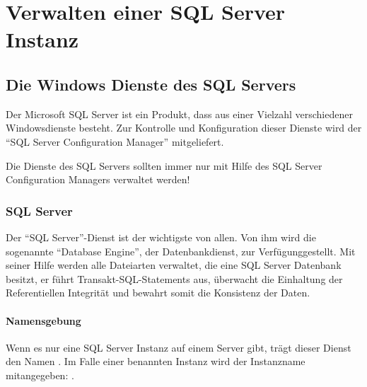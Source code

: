   \chapter{Verwalten einer SQL Server Instanz}
  \chaptertoc{}
  \cleardoubleevenpage

    \section{Die Windows Dienste des SQL Servers}
      Der Microsoft SQL Server ist ein Produkt, dass aus einer Vielzahl
      verschiedener Windowsdienste besteht. Zur Kontrolle und Konfiguration dieser
      Dienste wird der \enquote{SQL Server Configuration Manager} mitgeliefert.
      \begin{merke}
        Die Dienste des SQL Servers sollten immer nur mit Hilfe des SQL Server
        Configuration Managers verwaltet werden!
      \end{merke}
      \subsection{SQL Server}
        Der \enquote{SQL Server}-Dienst ist der wichtigste von allen. Von ihm
        wird die sogenannte \enquote{Database Engine}, der
        Datenbankdienst, zur Verfügunggestellt. Mit seiner Hilfe werden alle
        Dateiarten verwaltet, die eine SQL Server Datenbank besitzt, er führt
        Transakt-SQL-Statements aus, überwacht die Einhaltung der Referentiellen
        Integrität und bewahrt somit die Konsistenz der Daten.
        \subsubsection{Namensgebung}
          Wenn es nur eine SQL Server Instanz auf einem Server gibt, trägt dieser
          Dienst den Namen . Im Falle einer
          benannten Instanz wird der Instanzname mitangegeben: .
